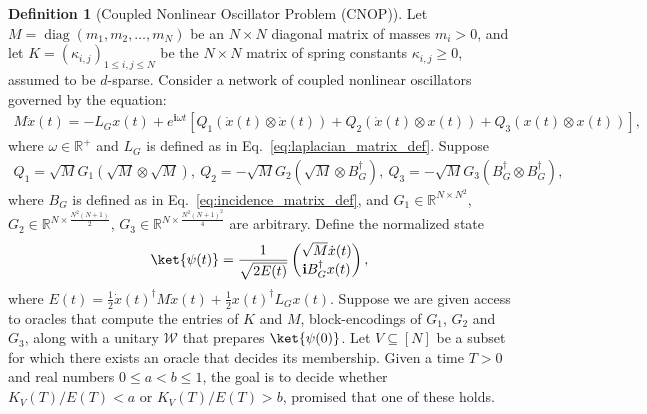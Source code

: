 \documentclass[superscriptaddress,onecolumn,nofootinbib,longbibliography,a4paper,accepted=2026-09-29]{quantumarticle}
\theoremstyle{plain}
\theoremstyle{definition}
\newtheorem{definition}[thm]{Definition}
\numberwithin{thm}{section}
\numberwithin{assumption}{section}
\numberwithin{lemma}{section}
\numberwithin{prop}{section}
\numberwithin{cor}{section}
\numberwithin{definition}{section}
\numberwithin{rmk}{section}
\numberwithin{equation}{section}
\newcommand{\R}{\mathbb{R}}
\newcommand{\lrb}[1]{\left ( #1 \right )}
\newcommand{\lrsb}[1]{\left [ #1 \right ]}
\renewcommand{\i}{\ensuremath{\mathbf{i}}}
\newcommand{\diag}[1]{\operatorname{diag}\lrb{#1}}
\begin{document}
\begin{definition}[Coupled Nonlinear Oscillator Problem (CNOP)]
Let $M=\diag{m_1,m_2,\dots,m_N}$ be an $N \times N$ diagonal matrix of masses $m_i>0$, and let $K=(\kappa_{i,j})_{1\le i,j\le N}$ be the $N\times N$ matrix of spring constants $\kappa_{i,j} \ge 0$, assumed to be $d$-sparse. Consider a network of coupled nonlinear oscillators governed by the equation:
\begin{align}
M\ddot{x}(t) = -L_G x(t)+ e^{\i \omega t}\lrsb{Q_1 (\dot{x}(t) \otimes \dot{x}(t)) + Q_2 (\dot{x}(t) \otimes x(t)) + Q_3 (x(t)\otimes x(t))
},
\end{align}
where $\omega \in \R^+$ and $L_G$ is defined as in Eq.~\eqref{eq:laplacian_matrix_def}. Suppose
\begin{align}
Q_1 = \sqrt{M} G_1 \lrb{\sqrt{M}\otimes \sqrt{M}},
~Q_2 = -\sqrt{M} G_2 \lrb{\sqrt{M} \otimes B_G^\dagger}, 
~Q_3 = -\sqrt{M} G_3 \lrb{B_G^\dagger \otimes B_G^\dagger},   
\end{align}
where $B_G$ is defined as in Eq.~\eqref{eq:incidence_matrix_def}, and
$G_1 \in \R^{N \times N^2}$, $G_2 \in \R^{N \times \frac{N^2(N+1)}{2}}$,
$G_3 \in \R^{N \times \frac{N^2(N+1)^2}{4}}$ are arbitrary.
Define the normalized state 
\begin{align}
\ket{\psi(t)}=\frac{1}{\sqrt{2E(t)}}\begin{pmatrix}
    \sqrt{M}\dot{x}(t) \\
    \i B_G^\dagger x(t)
\end{pmatrix},
\end{align} 
where $E(t)=\frac{1}{2}\dot{x}(t)^\dagger M \dot{x}(t)+\frac{1}{2}x(t)^\dagger L_G x(t)$. Suppose we are given access to oracles that compute the entries of $K$ and $M$, block-encodings of $G_1$, $G_2$ and $G_3$, along with a unitary $\mathcal{W}$ that prepares $\ket{\psi(0)}$. 
Let $V \subseteq [N]$ be a subset for which there exists an oracle that decides its membership. Given a time $T>0$ and real numbers $0\le a < b \le 1$, the goal is to decide whether $K_V(T)/E(T) <a$ or $K_V(T)/E(T) > b$, promised that one of these holds.    
\end{definition}
\end{document}
